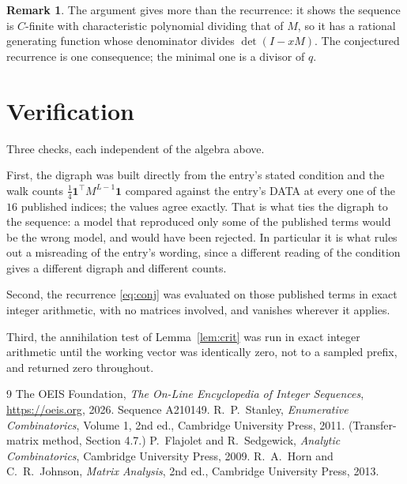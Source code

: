 \documentclass[11pt,a4paper]{article}
\theoremstyle{plain}
\theoremstyle{definition}
\newtheorem{remark}[theorem]{Remark}
\begin{document}
\begin{remark}
The argument gives more than the recurrence: it shows the sequence is $C$-finite with
characteristic polynomial dividing that of $M$, so it has a rational generating function
whose denominator divides $\det(I-xM)$. The conjectured recurrence is one consequence; the
minimal one is a divisor of $q$.
\end{remark}

\section{Verification}

Three checks, each independent of the algebra above.

First, the digraph was built directly from the entry's stated condition and the walk counts
$\tfrac1{4}\mathbf{1}^{\!\top}M^{L-1}\mathbf{1}$ compared against the entry's DATA at
every one of the $16$ published indices; the values agree exactly. That is what ties
the digraph to the sequence: a model that reproduced only some of the published terms would
be the wrong model, and would have been rejected. In particular it is what rules out a
misreading of the entry's wording, since a different reading of the condition gives a
different digraph and different counts.

Second, the recurrence \eqref{eq:conj} was evaluated on those published terms in exact
integer arithmetic, with no matrices involved, and vanishes wherever it applies.

Third, the annihilation test of Lemma~\ref{lem:crit} was run in exact integer arithmetic
until the working vector was identically zero, not to a sampled prefix, and returned zero
throughout.

\begin{thebibliography}{9}
 The OEIS Foundation, \emph{The On-Line Encyclopedia of Integer
Sequences}, \url{https://oeis.org}, 2026. Sequence A210149.
 R.~P.~Stanley, \emph{Enumerative Combinatorics}, Volume 1, 2nd ed.,
Cambridge University Press, 2011. (Transfer-matrix method, Section 4.7.)
 P.~Flajolet and R.~Sedgewick, \emph{Analytic Combinatorics}, Cambridge
University Press, 2009.
 R.~A.~Horn and C.~R.~Johnson, \emph{Matrix Analysis}, 2nd ed., Cambridge
University Press, 2013.
\end{thebibliography}
\end{document}
